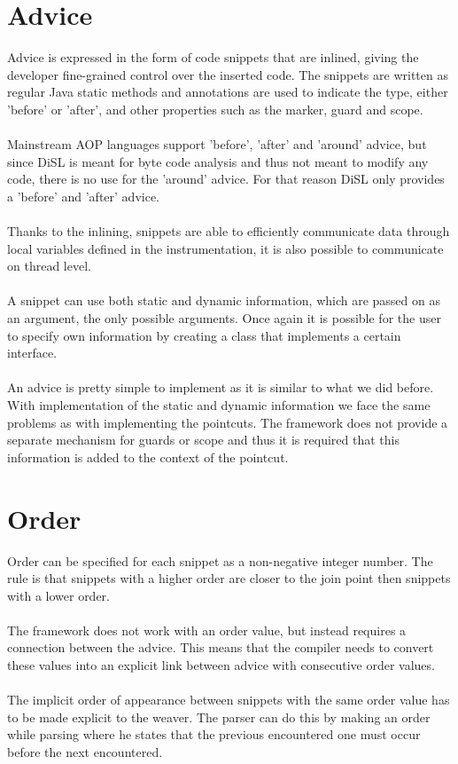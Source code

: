 \documentclass[a4paper]{report}
\begin{document}
\section{Advice}
Advice is expressed in the form of code snippets that are inlined, giving the developer fine-grained control over the inserted code. The snippets are written as regular Java static methods and annotations are used to indicate the type, either 'before' or 'after', and other properties such as the marker, guard and scope.\\
\\
Mainstream AOP languages support 'before', 'after' and 'around' advice, but since DiSL is meant for byte code analysis and thus not meant to modify any code, there is no use for the 'around' advice. For that reason DiSL only provides a 'before' and 'after' advice.\\
\\
Thanks to the inlining, snippets are able to efficiently communicate data through local variables defined in the instrumentation, it is also possible to communicate on thread level.\\
\\
A snippet can use both static and dynamic information, which are passed on as an argument, the only possible arguments. Once again it is possible for the user to specify own information by creating a class that implements a certain interface.\\
\\
An advice is pretty simple to implement as it is similar to what we did before. With implementation of the static and dynamic information we face the same problems as with implementing the pointcuts. The framework does not provide a separate mechanism for guards or scope and thus it is required that this information is added to the context of the pointcut.

\section{Order}
Order can be specified for each snippet as a non-negative integer number. The rule is that snippets with a higher order are closer to the join point then snippets with a lower order.\\
\\
The framework does not work with an order value, but instead requires a connection between the advice. This means that the compiler needs to convert these values into an explicit link between advice with consecutive order values.\\
\\
The implicit order of appearance between snippets with the same order value has to be made explicit to the weaver. The parser can do this by making an order while parsing where he states that the previous encountered one must occur before the next encountered.
\end{document}
